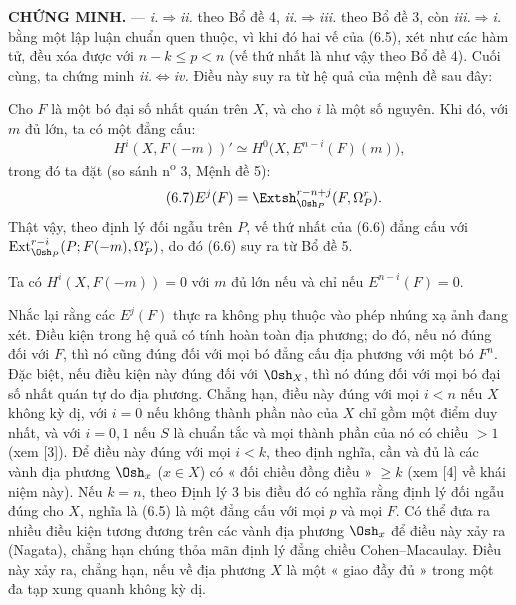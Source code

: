 \noindent\textbf{CHỨNG MINH.} --- \textit{i.}$\Rightarrow$\textit{ii.} theo
Bổ đề 4, \textit{ii.}$\Rightarrow$\textit{iii.} theo Bổ đề 3, còn
\textit{iii.}$\Rightarrow$\textit{i.} bằng một lập luận chuẩn quen thuộc,
vì khi đó hai vế của (6.5), xét như các hàm tử, đều xóa được với
$n-k\leq p<n$ (vế thứ nhất là như vậy theo Bổ đề 4). Cuối cùng, ta chứng minh
\textit{ii.}$\Leftrightarrow$\textit{iv.} Điều này suy ra từ hệ quả của
mệnh đề sau đây:

 Cho $F$ là một bó đại số nhất quán trên $X$, và cho
$i$ là một số nguyên. Khi đó, với $m$ đủ lớn, ta có một đẳng cấu:
\begin{equation}\tag{6.6}
  H^{i}(X,F(-m))'
  \simeq H^{0}\bigl(X,E^{n-i}(F)(m)\bigr),
\end{equation}
trong đó ta đặt (so sánh n\textsuperscript{o} 3, Mệnh đề 5):
\begin{equation}\tag{6.7}
  E^{j}(F)=\Extsh_{\Osh_P}^{r-n+j}(F,\Omega_P^{r}).
\end{equation}
Thật vậy, theo định lý đối ngẫu trên $P$, vế thứ nhất của (6.6)
đẳng cấu với
$\operatorname{Ext}_{\Osh_P}^{r-i}(P;F(-m),\Omega_P^{r})$, do đó (6.6) suy ra
từ Bổ đề 5.

 Ta có $H^{i}(X,F(-m))=0$ với $m$ đủ lớn nếu và chỉ nếu
$E^{n-i}(F)=0$.

Nhắc lại rằng các $E^{j}(F)$ thực ra không phụ thuộc vào phép nhúng xạ ảnh
đang xét. Điều kiện trong hệ quả có tính hoàn toàn địa phương; do đó,
nếu nó đúng đối với $F$, thì nó cũng đúng đối với mọi bó đẳng cấu địa phương
với một bó $F^{n}$. Đặc biệt, nếu điều kiện này đúng
đối với $\Osh_X$, thì nó đúng đối với mọi bó đại số nhất quán tự do địa phương.
Chẳng hạn, điều này đúng với mọi $i<n$ nếu $X$ không kỳ dị, với
$i=0$ nếu không thành phần nào của $X$ chỉ gồm một điểm duy nhất, và với $i=0,1$
nếu $S$ là chuẩn tắc và mọi thành phần của nó có chiều $>1$ (xem
[3]). Để điều này đúng với mọi
$i<k$, theo định nghĩa, cần và đủ là các vành địa phương
$\Osh_x$ ($x\in X$) có « đối chiều đồng điều » $\geq k$ (xem [4]
về khái niệm này). Nếu $k=n$, theo Định lý 3 bis điều đó có nghĩa rằng
định lý đối ngẫu đúng cho $X$, nghĩa là (6.5) là một đẳng cấu với
mọi $p$ và mọi $F$. Có thể đưa ra nhiều điều kiện tương đương trên
các vành địa phương $\Osh_x$ để điều này xảy ra (Nagata), chẳng hạn chúng
thỏa mãn định lý đẳng chiều Cohen--Macaulay. Điều này xảy ra,
chẳng hạn, nếu về địa phương $X$ là một « giao đầy đủ » trong một
đa tạp xung quanh không kỳ dị.


